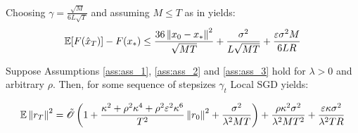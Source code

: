 \begin{corollary} \label{}
    Choosing $\gamma = \frac{\sqrt{M}}{6 L\sqrt{T}}$ and assuming $M \leq T$ as in \cite{Khaled} yields:
    \begin{align}
        \mathbb{E}[F(\hat{x}_T)] - F(x_*)
        \leq
          \frac{36 \left\|x_0-x_*\right\|^2}{\sqrt{MT}} + \frac{\sigma^2}{L\sqrt{MT}} + \frac{
          \varepsilon \sigma^2 M}{6 L R}
    \end{align}
\end{corollary}

\begin{theorem} \label{th:mu>0,rho>0}
    
    Suppose Assumptions \ref{ass:ass_1}, \ref{ass:ass_2} and \ref{ass:ass_3} hold for $\lambda > 0$ and arbitrary $\rho$. Then, for some sequence of stepsizes $\gamma_t$ Local SGD yields:

    \begin{align}
        \mathbb{E} \left\|r_T\right\|^2 = \tilde{\mathcal{O}} \left(1 + \frac{\kappa^2 + \rho^2\kappa^4 + \rho ^2\varepsilon^2 \kappa^6 }{T^2} \left\|r_0\right\|^2
         + \frac{\sigma^2}{\lambda^2 MT} \right)
         + \frac{\rho \kappa^2 \sigma^2}{\lambda^2 M T^2} 
        + \frac{\varepsilon \kappa \sigma^2}{\lambda^2 TR}
    \end{align}

\end{theorem}